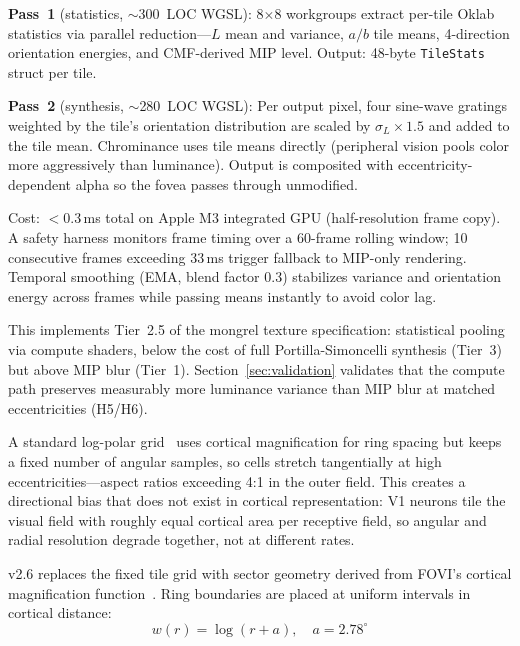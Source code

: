 \documentclass[10pt,twocolumn,letterpaper]{article}
\makeatletter
\renewcommand\subsection{\@startsection{subsection}{2}{\z@}{3pt}{1.5pt}{\normalfont\bfseries\small}}
\makeatother
\begin{document}
\textbf{Pass~1} (statistics, ${\sim}$300~LOC WGSL): 8$\times$8 workgroups extract per-tile Oklab statistics via parallel reduction---$L$ mean and variance, $a/b$ tile means, 4-direction orientation energies, and CMF-derived MIP level. Output: 48-byte \texttt{TileStats} struct per tile.

\textbf{Pass~2} (synthesis, ${\sim}$280~LOC WGSL): Per output pixel, four sine-wave gratings weighted by the tile's orientation distribution are scaled by $\sigma_L \times 1.5$ and added to the tile mean. Chrominance uses tile means directly (peripheral vision pools color more aggressively than luminance). Output is composited with eccentricity-dependent alpha so the fovea passes through unmodified.

Cost: ${<}$0.3\,ms total on Apple M3 integrated GPU (half-resolution frame copy). A safety harness monitors frame timing over a 60-frame rolling window; 10 consecutive frames exceeding 33\,ms trigger fallback to MIP-only rendering. Temporal smoothing (EMA, blend factor 0.3) stabilizes variance and orientation energy across frames while passing means instantly to avoid color lag.

This implements Tier~2.5 of the mongrel texture specification: statistical pooling via compute shaders, below the cost of full Portilla-Simoncelli synthesis (Tier~3) but above MIP blur (Tier~1). Section~\ref{sec:validation} validates that the compute path preserves measurably more luminance variance than MIP blur at matched eccentricities (H5/H6).

\subsection{Isotropic Cortical Sampling (v2.6)}\label{sec:isotropic}

A standard log-polar grid~\citep{schwartz1980} uses cortical magnification for ring spacing but keeps a fixed number of angular samples, so cells stretch tangentially at high eccentricities---aspect ratios exceeding 4:1 in the outer field. This creates a directional bias that does not exist in cortical representation: V1 neurons tile the visual field with roughly equal cortical area per receptive field, so angular and radial resolution degrade together, not at different rates.

v2.6 replaces the fixed tile grid with sector geometry derived from FOVI's cortical magnification function~\citep{blauch2026}. Ring boundaries are placed at uniform intervals in cortical distance:
\vspace{-2pt}
\begin{equation}
w(r) = \log(r + a), \quad a = 2.78^{\circ}
\end{equation}
\vspace{-4pt}
\end{document}
